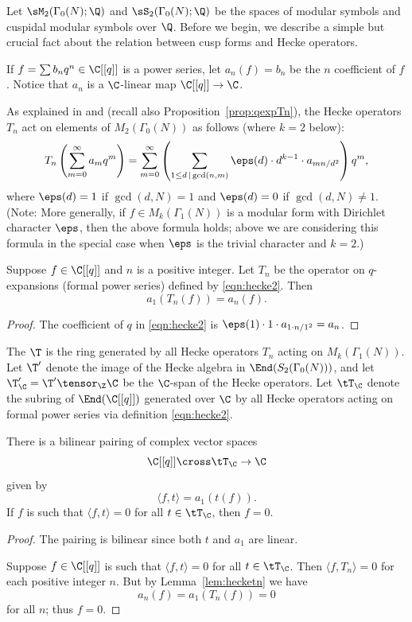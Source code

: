 Let $\sM_2(\Gamma_0(N);\Q)$ and $\sS_2(\Gamma_0(N);\Q)$ be the spaces
of modular symbols and cuspidal modular symbols over $\Q$.  Before we begin, we
describe a simple but crucial fact about the relation between cusp
forms and Hecke operators.

If $f = \sum b_n q^n \in \C[[q]]$ is a power series,
let $a_n(f) = b_n$ be the $n$ coefficient of $f$.
Notice that $a_n$ is a $\C$-linear map $\C[[q]] \to \C$.

As explained in \cite[Prop.~5.3.1]{diamond-shurman} and
\cite[\S{}VII.3]{lang:modular} (recall also Proposition~\ref{prop:qexpTn}), the
Hecke operators $T_n$ act on elements of
$M_2(\Gamma_0(N))$ as follows (where $k=2$ below):
\begin{equation}\label{eqn:hecke2}
  T_n\left(\sum_{m=0}^{\infty} a_m q^m\right) = 
\sum_{m=0}^{\infty}
   \left(\sum_{1\leq d\,\mid\, \gcd(n,m)} \eps(d) \cdot d^{k-1} \cdot a_{mn/d^2}\right) q^m,
 \end{equation}
 where $\eps(d)=1$ if $\gcd(d,N)=1$ and $\eps(d)=0$ if $\gcd(d,N)\neq 1$.
(Note: More generally, if $f \in M_k(\Gamma_1(N))$ is a modular form
with Dirichlet character $\eps$, then the above formula holds; above
we are considering this formula in the special case when $\eps$
is the trivial character and $k=2$.)

\begin{lemma}\label{lem:hecketn}
  Suppose $f\in \C[[q]]$ and $n$ is a positive integer.  Let $T_n$
be the operator on $q$-expansions (formal power series) defined
by \eqref{eqn:hecke2}.  Then
$$ 
  a_1(T_n(f)) = a_n(f).
$$
\end{lemma}
\begin{proof}
The coefficient of $q$ in \eqref{eqn:hecke2} is 
$\eps(1)\cdot 1 \cdot a_{1 \cdot n/1^2} = a_n$.
\end{proof}

The  $\T$ is the ring generated by all
Hecke operators $T_n$ acting on $M_k(\Gamma_1(N))$.
Let $\T'$ denote the image of the Hecke algebra in
$\End(S_2(\Gamma_0(N)))$, and let $\T'_\C=\T'\tensor_\Z\C$ be the
$\C$-span of the Hecke operators.  Let $\tT_\C$ denote the subring of
$\End(\C[[q]])$ generated over $\C$ by all Hecke operators acting on
formal power series via definition \eqref{eqn:hecke2}.

\begin{proposition}\label{prop:tildeduality}
There is a  bilinear pairing of complex vector spaces
$$
  \C[[q]] \cross \tT_\C \to \C
$$
given by 
$$
  \langle f, t \rangle = a_1(t(f)).
$$
If $f$ is such that $\langle f, t\rangle = 0$ for
all $t\in \tT_\C$, then $f=0$.
\end{proposition}
\begin{proof}
The pairing is bilinear since both $t$ and $a_1$ are linear.

Suppose $f\in \C[[q]]$ is such that 
$\langle f, t\rangle = 0$ for all $t\in \tT_\C$.
Then $\langle f, T_n\rangle = 0$
for each positive integer $n$.
But by Lemma~\ref{lem:hecketn} we have 
$$a_n(f) = a_1(T_n(f)) = 0$$
for all $n$; thus $f=0$. 
\end{proof}

